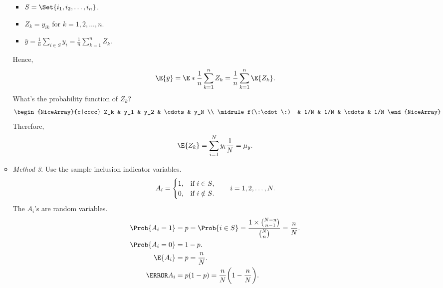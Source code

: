 \begin{Result}{}
\begin{enumerate}[(a)]
\begin{itemize}
                              \begin{itemize}
                                    \item $ S=\Set{i_1,i_2,\ldots,i_n} $.
                                    \item $ Z_k=y_{ik} $ for $k=1,2,\ldots,n$.
                                    \item $ \bar{y}=\frac{1}{n}\sum_{i\in S}y_i=\frac{1}{n}\sum_{k=1}^{n}Z_k $.
                              \end{itemize}
                              Hence,
                              \[ \E{\bar{y}}=\E*{\frac{1}{n}\sum_{k=1}^n Z_k}
                                    =\frac{1}{n}\sum_{k=1}^{n}\E{Z_k}. \]
                              What's the probability function of $ Z_k $?
                              \[ \begin{NiceArray}{c|cccc}
                                          Z_k          & y_1 & y_2 & \cdots & y_N \\
                                          \midrule
                                          f(\:\cdot\:) & 1/N & 1/N & \cdots & 1/N
                                    \end{NiceArray} \]
                              Therefore,
                              \[ \E{Z_k}=\sum_{i=1}^{N}y_i \frac{1}{N}=\mu_y. \]
                        \item \emph{Method 3}. Use the sample inclusion indicator variables.
                              \[ A_i=\begin{cases}
                                          1, & \text{if $ i\in S $},    \\
                                          0, & \text{if $ i\notin S $}.
                                    \end{cases}\qquad i=1,2,\ldots,N. \]
                              The $ A_i $'s are random variables.
                              \begin{align*}
                                    \Prob{A_i=1} & =p=\Prob{i\in S}=\frac{1\times \binom{N-n}{n-1}}{\binom{N}{n}}=\frac{n}{N}. \\
                                    \Prob{A_i=0} & =1-p.                                                                       \\
                                    \E{A_i}      & =p=\frac{n}{N}.                                                             \\
                                    \V{A_i}      & =p(1-p)=\frac{n}{N}\biggl(1-\frac{n}{N}\biggr).                             \\

\end{align*}
\end{itemize}
\end{enumerate}
\end{Result}
